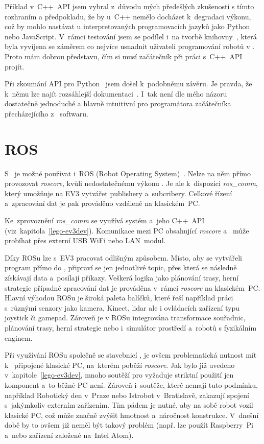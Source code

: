Příklad v~C++~API jsem vybral z~důvodu mých předešlých zkušenosti s tímto rozhraním a předpokladu, že by u~C++ nemělo docházet k~degradaci výkonu, což by mohlo nastávat u interpretovaných programovacích jazyků jako Python nebo JavaScript.
V~rámci testování \evThreeDev{} jsem se podílel i~na tvorbě knihovny~\cite{legoMindstormsEV3_ev3dev_RB-ev3dev-cpp-lib}, která byla vyvíjena se záměrem co nejvíce  usnadnit uživateli programování robotů v \evThreeDev{}. Proto mám dobrou představu, čím si musí začátečník při práci s~C++~API projít.    

Při zkoumání API pro Python~\cite{legoMindstormsEV3_ev3dev-lang-python} jsem došel k~podobnému závěru. 
Je pravda, že k~němu lze najít rozsáhlejší dokumentaci~\cite{legoMindstormsEV3_ev3dev-lang-python-docs}. 
I~tak není dle mého názoru dostatečně jednoduché a hlavně intuitivní pro programátora začátečníka přecházejícího z~\lego{} softwaru.


\section{ROS}

S~\legoEV{} je možné používat i~ROS (Robot Operating System)~\cite{legoProgramingPlatform_ROS}. 
Nelze na něm přímo provozovat \textit{roscore}, kvůli nedostatečnému výkonu . 
Je ale k~dispozici \textit{ros\_comm}, který umožňuje na EV3 vytvářet publishery a~subcribery.
Celkové řízení a~zpracování dat je pak prováděno vzdáleně na klasickém~PC.

Ke~zprovoznění \textit{ros\_comm} se využívá systém \evThreeDev{} a~jeho C++~API (viz~kapitola~\ref{lego-ev3dev}). 
Komunikace mezi PC obsahující \textit{roscore} a~ může probíhat přes externí USB WiFi nebo LAN~modul.

Díky ROSu lze s~EV3 pracovat odlišným způsobem. 
Místo, aby se vytvářeli program přímo do , připraví se jen jednotlivé topic, přes která se následně získávají data a~posílají příkazy. 
Veškerá logika jako plánování trasy, herní strategie případně zpracování dat je prováděna v~rámci \textit{roscore} na klasickém~PC.
Hlavní výhodou ROSu je široká paleta balíčků, které řeší například práci s~různými senzory jako kamera, Kinect, lidar ale i ovládacích zařízení typu joystick či gamepad. 
Zároveň je v ROSu integrována transformace souřadnic, plánování trasy, herní strategie nebo i~simulátor prostředí a~robotů s fyzikálním enginem.

Při využívání ROSu společně se stavebnicí \lego{}, je ovšem problematická nutnost mít k~ připojené klasické PC, na~kterém poběží \textit{roscore}. 
Jak bylo již uvedeno v~kapitole~\ref{lego-ev3dev}, mnoho soutěží pro \legoM{} vyžaduje striktní použití jen \lego{} komponent a~to běžné PC není. 
Zároveň i~soutěže, které nemají tuto podmínku, například Robotický den v~Praze nebo Istrobot v~Bratislavě, zakazují spojení s~jakýmkoliv externím zařízením.
Tím pádem je nutné, aby na sobě \lego{} robot vozil klasické PC, což může značně zvýšit hmotnost a~náročnost konstrukce. 
V~dnešní době by to ovšem již neměl být takový problém (např. lze použít Raspberry~Pi a~nebo zařízení založené na~Intel Atom).



